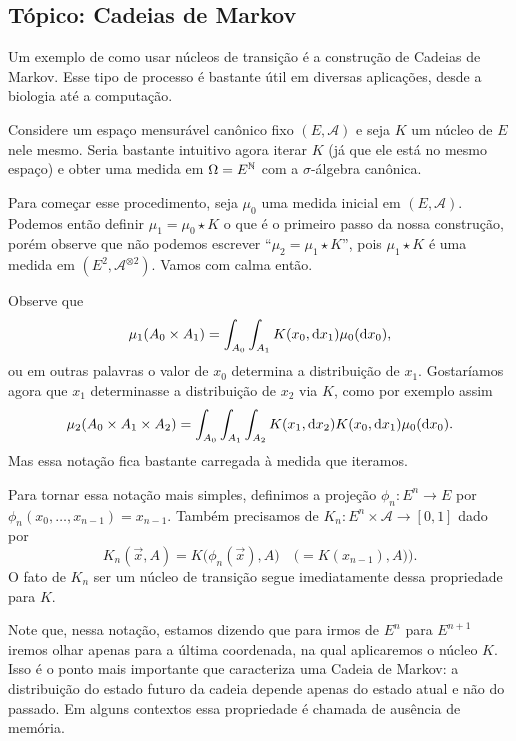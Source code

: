 \begin{topics}
\section{Tópico: Cadeias de Markov}
\label{s:cadeias_Markov}

Um exemplo de como usar núcleos de transição é a construção de Cadeias de Markov.
Esse tipo de processo é bastante útil em diversas aplicações, desde a biologia até a computação.

Considere um espaço mensurável canônico fixo $(E, \mathcal{A})$ e seja $K$ um núcleo de $E$ nele mesmo.
Seria bastante intuitivo agora iterar $K$ (já que ele está no mesmo espaço) 
e obter uma medida em $\Omega =E^{{\mathbb N}}$ com a $\sigma$-álgebra canônica.

Para começar esse procedimento, seja $\mu_0$ uma medida inicial em $(E, \mathcal{A})$.
Podemos então definir $\mu_1 = \mu_0 \star K$ o que é 
o primeiro passo da nossa construção, porém observe que não podemos escrever 
``$\mu_2 = \mu_1 \star K$'', pois $\mu_1 \star K$ é uma medida em $(E^2, \mathcal{A}^{\otimes 2})$.
Vamos com calma então.

Observe que
\begin{equation}
  \mu_1(A_0 \times A_1) = \int_{A_0} \int_{A_1} K(x_0, \mathop{}\!\mathrm{d} x_1) \mu_0(\mathop{}\!\mathrm{d} x_0),
\end{equation}
ou em outras palavras o valor de $x_0$ determina a distribuição de $x_1$.
Gostaríamos agora que $x_1$ determinasse a distribuição de $x_2$ via $K$, como por exemplo assim
\begin{equation}
  \mu_2(A_0 \times A_1 \times A_2) = \int_{A_0} \int_{A_1} \int_{A_2} K(x_1, \mathop{}\!\mathrm{d} x_2) K(x_0, \mathop{}\!\mathrm{d} x_1) \mu_0 (\mathop{}\!\mathrm{d} x_0).
\end{equation}
Mas essa notação fica bastante carregada à medida que iteramos.

Para tornar essa notação mais simples, definimos a projeção $\phi_n:E^n \to E$ por $\phi_n(x_0, \dots, x_{n-1}) = x_{n-1}$.
Também precisamos de $K_n: E^n \times \mathcal{A} \to [0,1]$ dado por
\begin{equation}
  K_n(\vec{x},A) = K\big(\phi_n(\vec{x}), A\big) \quad \big(= K(x_{n-1}),A) \big).
\end{equation}
O fato de $K_n$ ser um núcleo de transição segue imediatamente dessa propriedade para $K$.

Note que, nessa notação, estamos dizendo que para irmos de $E^n$ para $E^{n+1}$ iremos olhar apenas para a última coordenada, na qual aplicaremos o núcleo $K$.
Isso é o ponto mais importante que caracteriza uma Cadeia de Markov: a distribuição do estado futuro da cadeia depende apenas do estado atual e não do passado.
Em alguns contextos essa propriedade é chamada de ausência de memória.


\end{topics}

